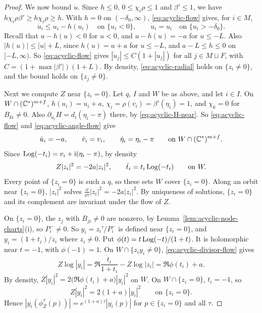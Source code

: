 \documentclass[12pt, letter]{amsart}
\theoremstyle{definition}
\begin{document}
\begin{proof}
We now bound $\dot u$.
Since $h\le0$, $0\le\chi_i\rho\le1$ and $\beta'\le1$, we have $h\chi_i\rho\beta'\ge h\chi_i\rho\ge h$.
With $h=0$ on $(-\delta_0,\infty)$, \eqref{eq:acyclic-flow} gives, for $i\in M$,
\begin{equation}\label{eq:acyclic-radial}
 \dot u_i\le u_i-h(u_i)\quad\text{on }\{u_i<0\},\qquad \dot u_i=u_i\quad\text{on }\{u_i>-\delta_0\}.
\end{equation}
Recall that $u-h(u)<0$ for $u<0$, and $u-h(u)=-a$ for $u\le-L$.
Also $|h(u)|\le|u|+L$, since $h(u)=u+a$ for $u\le-L$, and $a-L\le h\le0$ on $[-L,\infty)$.
So \eqref{eq:acyclic-flow} gives $|\dot u_j|\le C(1+|u_j|)$ for all $j\in M\sqcup F$, with $C=(1+\max|\beta'|)(1+L)$.
By density, \eqref{eq:acyclic-radial} holds on $\{z_i\ne0\}$, and the bound holds on $\{z_j\ne0\}$.

Next we compute $Z$ near $\{z_i=0\}$.
Let $q$, $I$ and $W$ be as above, and let $i\in I$.
On $W\cap(\mathbb{C}^*)^{m+f}$, $h(u_i)=u_i+a$, $\chi_i=\rho(v_i)=\beta'(\eta_i)=1$, and $\chi_k=0$ for $B_{ki}\ne0$.
Also $\partial_{u_i}H=d_i(\eta_i-\pi)$ there, by \eqref{eq:acyclic-H-near}.
So \eqref{eq:acyclic-flow} and \eqref{eq:acyclic-angle-flow} give
\[
 \dot u_i=-a,\qquad \dot v_i=v_i,\qquad \dot\eta_i=\eta_i-\pi\qquad\text{on }W\cap(\mathbb{C}^*)^{m+f}.
\]
Since $\operatorname{Log}(-t_i)=v_i+\mathrm i(\eta_i-\pi)$, by density
\begin{equation}\label{eq:acyclic-divisor-flow}
 Z|z_i|^2=-2a|z_i|^2,\qquad \dot t_i=t_i\operatorname{Log}(-t_i)\qquad\text{on }W.
\end{equation}
Every point of $\{z_i=0\}$ is such a $q$, so these sets $W$ cover $\{z_i=0\}$.
Along an orbit near $\{z_i=0\}$, $|z_i|^2$ solves $\frac{\dd}{\dd\tau}|z_i|^2=-2a|z_i|^2$.
By uniqueness of solutions, $\{z_i=0\}$ and its complement are invariant under the flow of $Z$.

On $\{z_i=0\}$, the $z_j$ with $B_{ji}\ne0$ are nonzero, by Lemma~\ref{lem:acyclic-node-charts}(i), so $P_i^-\ne0$.
So $y_i=z_i'/P_i^-$ is defined near $\{z_i=0\}$, and $y_i=(1+t_i)/z_i$ where $z_i\ne0$.
Put $\phi(t)=t\operatorname{Log}(-t)/(1+t)$.
It is holomorphic near $t=-1$, with $\phi(-1)=1$.
On $W\cap\{z_iy_i\ne0\}$, \eqref{eq:acyclic-divisor-flow} gives
\[
 Z\log|y_i|=\Re\frac{\dot t_i}{1+t_i}-Z\log|z_i|=\Re\phi(t_i)+a .
\]
By density, $Z|y_i|^2=2\bigl(\Re\phi(t_i)+a\bigr)|y_i|^2$ on $W$.
On $W\cap\{z_i=0\}$, $t_i=-1$, so
\begin{equation}\label{eq:acyclic-partner-flow}
 Z|y_i|^2=2(1+a)|y_i|^2\qquad\text{on }\{z_i=0\}.
\end{equation}
Hence $|y_i(\phi_Z^\tau(p))|=e^{(1+a)\tau}|y_i(p)|$ for $p\in\{z_i=0\}$ and all $\tau$.


\end{proof}
\end{document}
